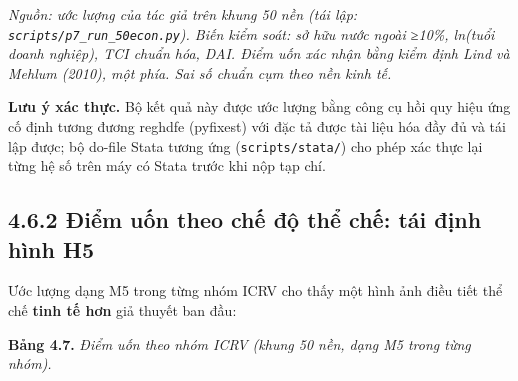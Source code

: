 \documentclass[
  a4paper,
  13pt]{extreport}
\begin{document}
\emph{Nguồn: ước lượng của tác giả trên khung 50 nền (tái lập:
\texttt{scripts/p7\_run\_50econ.py}). Biến kiểm soát: sở hữu nước ngoài
≥10\%, ln(tuổi doanh nghiệp), TCI chuẩn hóa, DAI. Điểm uốn xác nhận bằng
kiểm định Lind và Mehlum (2010), một phía. Sai số chuẩn cụm theo nền
kinh tế.}

\textbf{Lưu ý xác thực.} Bộ kết quả này được ước lượng bằng công cụ hồi
quy hiệu ứng cố định tương đương reghdfe (pyfixest) với đặc tả được tài
liệu hóa đầy đủ và tái lập được; bộ do-file Stata tương ứng
(\texttt{scripts/stata/}) cho phép xác thực lại từng hệ số trên máy có
Stata trước khi nộp tạp chí.

\hypertarget{ux111iux1ec3m-uux1ed1n-theo-chux1ebf-ux111ux1ed9-thux1ec3-chux1ebf-tuxe1i-ux111ux1ecbnh-huxecnh-h5}{%
\subsection{4.6.2 Điểm uốn theo chế độ thể chế: tái định hình
H5}\label{ux111iux1ec3m-uux1ed1n-theo-chux1ebf-ux111ux1ed9-thux1ec3-chux1ebf-tuxe1i-ux111ux1ecbnh-huxecnh-h5}}

Ước lượng dạng M5 trong từng nhóm ICRV cho thấy một hình ảnh điều tiết
thể chế \textbf{tinh tế hơn} giả thuyết ban đầu:

\textbf{Bảng 4.7.} \emph{Điểm uốn theo nhóm ICRV (khung 50 nền, dạng M5
trong từng nhóm).}
\end{document}
